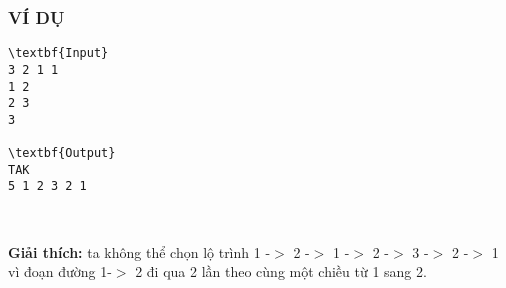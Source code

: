 \subsubsection{VÍ DỤ}
\begin{verbatim}
\textbf{Input}
3 2 1 1
1 2
2 3
3

\textbf{Output}
TAK
5 1 2 3 2 1\end{verbatim}

 

\textbf{Giải thích:} ta không thể chọn lộ trình 1 -$>$ 2 -$>$ 1 -$>$ 2 -$>$ 3 -$>$ 2 -$>$ 1 vì đoạn đường 1-$>$ 2 đi qua 2 lần theo cùng một chiều từ 1 sang 2.
